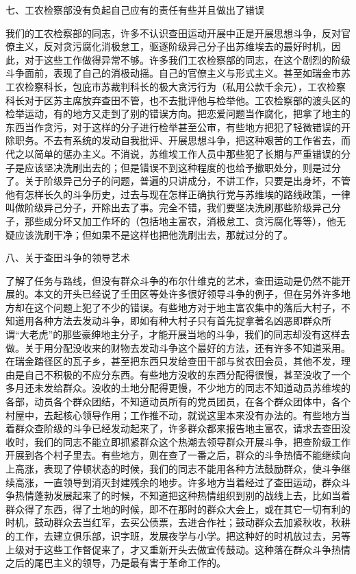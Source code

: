 七、工农检察部没有负起自己应有的责任有些并且做出了错误

我们的工农检察部的同志，许多不认识查田运动开展中正是开展思想斗争，反对官僚主义，反对贪污腐化消极怠工，驱逐阶级异己分子出苏维埃去的最好时机，因此，对于这些工作做得异常不够。许多我们工农检察部的同志，在这个剧烈的阶级斗争面前，表现了自己的消极动摇。自己的官僚主义与形式主义。甚至如瑞金市苏工农检察科长，包庇市苏裁判科长的极大贪污行为（私用公款千余元），工农检察科长对于区苏主席放弃查田不管，也不去批评他与检举他。工农检察部的渡头区的检举运动，有的地方又走到了别的错误方向。把恋爱问题当作腐化，把拿了地主的东西当作贪污，对于这样的分子进行检举甚至公审，有些地方把犯了轻微错误的开除职务。不去有系统的发动自我批评、开展思想斗争，把这种艰苦的工作省去，而代之以简单的惩办主义。不消说，苏维埃工作人员中那些犯了长期与严重错误的分子是应该坚决洗刷出去的；但是错误不到这种程度的也给予撤职处分，则是过分了。关于阶级异己分子的问题，普遍的只讲成分，不讲工作，只要是出身坏，不管他有怎样长久的斗争历史，过去与现在怎样正确执行党与苏维埃的路线政策，一律叫做阶级异己分子，开除出去了事。完全不错，我们要坚决洗刷那些阶级异己分子，那些成分坏又加工作坏的（包括地主富农，消极怠工、贪污腐化等等），他无疑应该洗刷干净；但如果不是这样也把他洗刷出去，那就过分的了。

八、关于查田斗争的领导艺术

了解了任务与路线，但没有群众斗争的布尔什维克的艺术，查田运动是仍然不能开展的。本文的开头已经说了壬田区等处许多很好领导斗争的例子，但在另外许多地方却在这个问题上犯了不少的错误。有些地方对于地主富农集中的落后大村子，不知道用各种方法去发动斗争，即如有种大村子只有首先捉拿著名凶恶即群众所谓“大老虎”的那些豪绅地主分子，才能开展当地的斗争，我们的同志却没有这样去做。关于用分配没收来的财物去发动斗争这个最好的方法，还有许多不知道采用。在瑞金踏径区的瓦子乡，甚至把东西只发给查田干部与贫农田会员，其他不发，理由是自己不积极的不应分东西。有些地方没收的东西分配得很慢，甚至没收了一个多月还未发给群众。没收的土地分配得更慢，不少地方的同志不知道动员苏维埃的各部，动员各个群众团结，不知道动员所有的党员团员，在各个群众团体中，各个村屋中，去起核心领导作用；工作推不动，就说这里本来没有办法的。有些地方当着群众查阶级的斗争已经发动起来了，许多群众都来报告地主富农，请求去查田没收时，我们的同志不能立即抓紧群众这个热潮去领导群众开展斗争，把查阶级工作开展到各个村子里去。有些地方，则在查了一番之后，群众的斗争热情不能继续向上高涨，表现了停顿状态的时候，我们的同志不能用各种方法鼓励群众，使斗争继续高涨，一直领导到消灭封建残余的地步。许多地方当着经过了查田运动，群众斗争热情蓬勃发展起来了的时候，不知道把这种热情组织到别的战线上去，比如当着群众得了东西，得了土地的时候，即不在那时的群众大会上，或在其它一切有利的时机，鼓动群众去当红军，去买公债票，去进合作社；鼓动群众去加紧秋收，秋耕的工作，去建立俱乐部，识字班，发展夜学与小学。把这种好的时机放过去，另等上级对于这些工作督促来了，才又重新开头去做宣传鼓动。这种落在群众斗争热情之后的尾巴主义的领导，乃是最有害于革命工作的。


